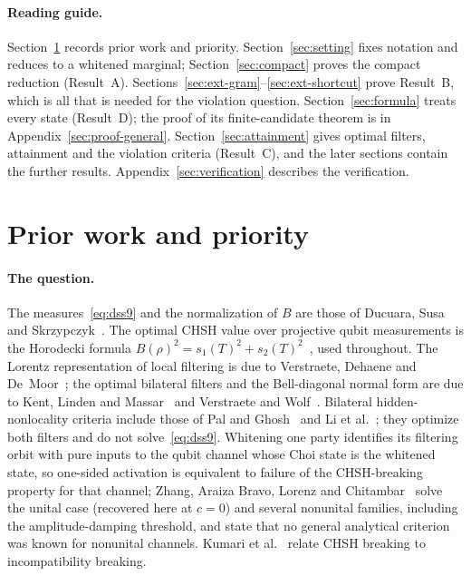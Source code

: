 \documentclass[11pt,a4paper]{article}
\theoremstyle{remark}\newtheorem{remark}[theorem]{Remark}
\begin{document}
\paragraph{Reading guide.}
Section~\ref{sec:prior} records prior work and priority.
Section~\ref{sec:setting} fixes notation and reduces to a whitened marginal;
Section~\ref{sec:compact} proves the compact reduction (Result~A).
Sections~\ref{sec:ext-gram}--\ref{sec:ext-shortcut} prove Result~B, which is
all that is needed for the violation question. Section~\ref{sec:formula}
treats every state (Result~D); the proof of its finite-candidate theorem is
in Appendix~\ref{sec:proof-general}. Section~\ref{sec:attainment} gives optimal filters, attainment
and the violation criteria (Result~C), and the later sections contain the
further results. Appendix~\ref{sec:verification} describes the
verification.

\section{Prior work and priority}
\label{sec:prior}

\paragraph{The question.} The measures~\eqref{eq:dss9} and the normalization
of $B$ are those of Ducuara, Susa and Skrzypczyk~\cite{ducuara}. The
optimal CHSH value over projective qubit measurements is the Horodecki
formula $B(\rho)^2=s_1(T)^2+s_2(T)^2$~\cite{horodecki1995}, used
throughout. The Lorentz representation of local filtering is due to
Verstraete, Dehaene and De~Moor~\cite{verstraete}; the optimal bilateral
filters and the Bell-diagonal normal form are due to Kent, Linden and
Massar~\cite{klm} and Verstraete and Wolf~\cite{verstraetewolf}.
Bilateral hidden-nonlocality criteria include those of Pal and
Ghosh~\cite{palghosh} and Li et al.~\cite{li2017}; they optimize both
filters and do not solve~\eqref{eq:dss9}. Whitening one party identifies
its filtering orbit with pure inputs to the qubit channel whose Choi state
is the whitened state, so one-sided activation is equivalent to failure of
the CHSH-breaking property for that channel; Zhang, Araiza Bravo, Lorenz
and Chitambar~\cite{zhang} solve the unital case (recovered here at
$c=0$) and several nonunital families, including the amplitude-damping
threshold, and state that no general analytical criterion was known for
nonunital channels. Kumari et al.~\cite{kumari} relate CHSH breaking to
incompatibility breaking.
\end{document}
